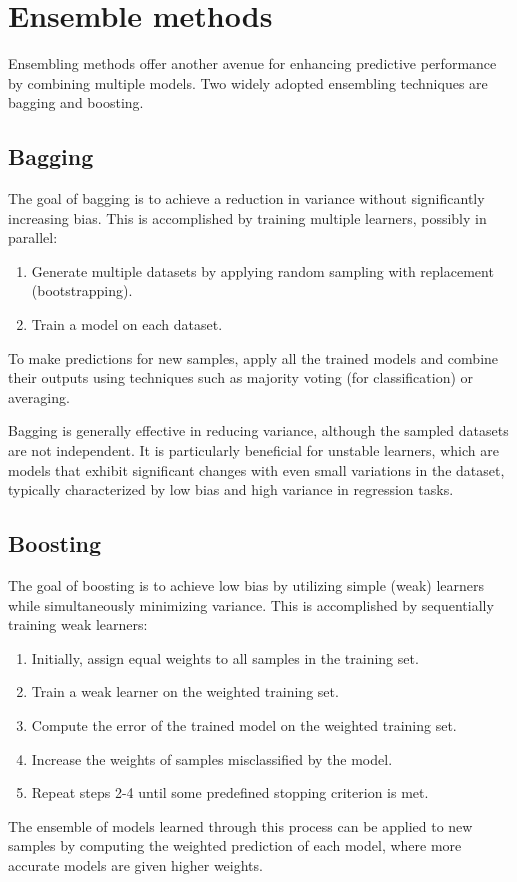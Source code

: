 \section{Ensemble methods}

Ensembling methods offer another avenue for enhancing predictive performance by combining multiple models.
Two widely adopted ensembling techniques are bagging and boosting.

\subsection{Bagging}
The goal of bagging is to achieve a reduction in variance without significantly increasing bias. 
This is accomplished by training multiple learners, possibly in parallel:
\begin{enumerate}
    \item Generate multiple datasets by applying random sampling with replacement (bootstrapping).
    \item Train a model on each dataset.
\end{enumerate}
To make predictions for new samples, apply all the trained models and combine their outputs using techniques such as majority voting (for classification) or averaging.

Bagging is generally effective in reducing variance, although the sampled datasets are not independent. 
It is particularly beneficial for unstable learners, which are models that exhibit significant changes with even small variations in the dataset, typically characterized by low bias and high variance in regression tasks.

\subsection{Boosting}
The goal of boosting is to achieve low bias by utilizing simple (weak) learners while simultaneously minimizing variance. 
This is accomplished by sequentially training weak learners:
\begin{enumerate}
    \item Initially, assign equal weights to all samples in the training set.
    \item Train a weak learner on the weighted training set.
    \item Compute the error of the trained model on the weighted training set.
    \item Increase the weights of samples misclassified by the model.
    \item Repeat steps 2-4 until some predefined stopping criterion is met.
\end{enumerate}
The ensemble of models learned through this process can be applied to new samples by computing the weighted prediction of each model, where more accurate models are given higher weights.

